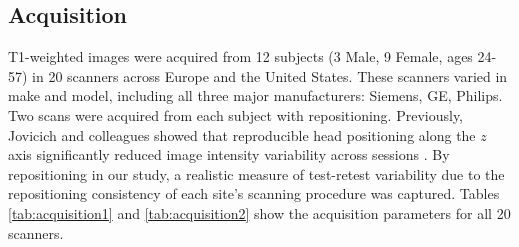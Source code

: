 \subsection{Acquisition}
T1-weighted images were acquired from 12 subjects (3 Male, 9 Female, ages 24-57) in 20 scanners across Europe and the United States. These scanners varied in make and model, including all three major manufacturers: Siemens, GE, Philips. Two scans were acquired from each subject with repositioning. Previously, Jovicich and colleagues showed that reproducible head positioning along the $z$ axis significantly reduced image intensity variability across sessions \cite{freesurferReliability}. By repositioning in our study, a realistic measure of test-retest variability due to the repositioning consistency of each site's scanning procedure was captured. Tables \ref{tab:acquisition1} and \ref{tab:acquisition2} show the acquisition parameters for all 20 scanners.